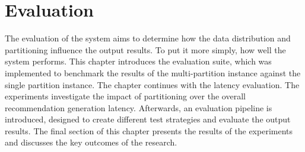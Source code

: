 \chapter{Evaluation}
\label{chap:evaluation}

The evaluation of the system aims to determine how the data distribution and partitioning influence the output results. To put it more simply, how well the system performs. This chapter introduces the evaluation suite, which was implemented to benchmark the results of the multi-partition instance against the single partition instance. The chapter continues with the latency evaluation. The experiments investigate the impact of partitioning over the overall recommendation generation latency. Afterwards, an evaluation pipeline is introduced, designed to create different test strategies and evaluate the output results. The final section of this chapter presents the results of the experiments and discusses the key outcomes of the research.
